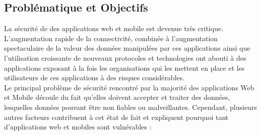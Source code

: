 \subsection{Problématique et Objectifs}
La sécurité de des applications web et mobile est devenue très critique. L’augmentation rapide de la connectivité, combinée à l’augmentation spectaculaire de la valeur des données manipulées par ces applications ainsi que l’utilisation croissante de nouveaux protocoles et technologies ont abouti à des applications exposant à la fois les organisations qui les mettent en place et les utilisateurs de ces applications à des risques considérables.\\
Le principal problème de sécurité rencontré par la majorité des applications Web et Mobile découle du fait qu’elles doivent accepter et traiter des données, lesquelles données pouvant être non fiables ou malveillantes. Cependant, plusieurs autres facteurs \cite{hacker-handbook} contribuent à cet état de fait et expliquent pourquoi tant d'applications web et mobiles sont vulnérables :
